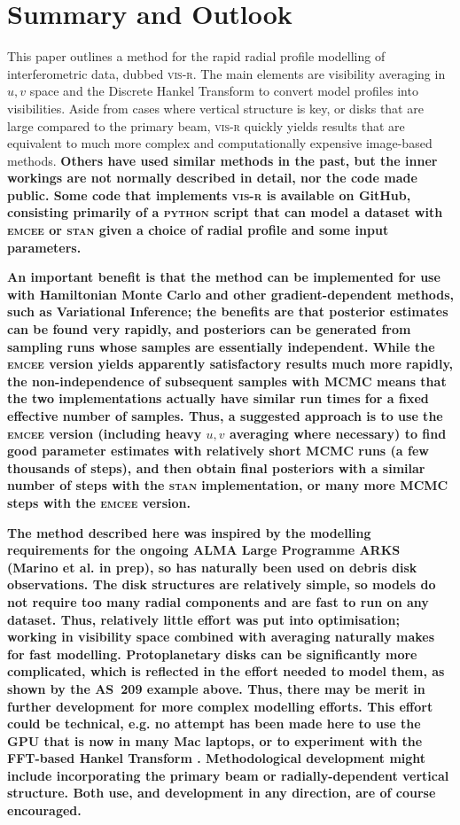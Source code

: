 \documentclass[fleqn,usenatbib]{mnras}
\begin{document}
\section{Summary and Outlook}

This paper outlines a method for the rapid radial profile modelling of interferometric data, dubbed \textsc{vis-r}. The main elements are visibility averaging in $u,v$ space and the Discrete Hankel Transform to convert model profiles into visibilities. Aside from cases where vertical structure is key, or disks that are large compared to the primary beam, \textsc{vis-r} quickly yields results that are equivalent to much more complex and computationally expensive image-based methods. \textbf{Others have used similar methods in the past, but the inner workings are not normally described in detail, nor the code made public. Some code that implements \textsc{vis-r} is available on GitHub, consisting primarily of a \textsc{python} script that can model a dataset with \textsc{emcee} or \textsc{stan} given a choice of radial profile and some input parameters.}

\textbf{An important benefit is that the method can be implemented for use with Hamiltonian Monte Carlo and other gradient-dependent methods, such as Variational Inference; the benefits are that posterior estimates can be found very rapidly, and posteriors can be generated from sampling runs whose samples are essentially independent. While the \textsc{emcee} version yields apparently satisfactory results much more rapidly, the non-independence of subsequent samples with MCMC means that the two implementations actually have similar run times for a fixed effective number of samples. Thus, a suggested approach is to use the \textsc{emcee} version (including heavy $u,v$ averaging where necessary) to find good parameter estimates with relatively short MCMC runs (a few thousands of steps), and then obtain final posteriors with a similar number of steps with the \textsc{stan} implementation, or many more MCMC steps with the \textsc{emcee} version.}

\textbf{The method described here was inspired by the modelling requirements for the ongoing ALMA Large Programme ARKS (Marino et al. in prep), so has naturally been used on debris disk observations. The disk structures are relatively simple, so models do not require too many radial components and are fast to run on any dataset. Thus, relatively little effort was put into optimisation; working in visibility space combined with averaging naturally makes for fast modelling. Protoplanetary disks can be significantly more complicated, which is reflected in the effort needed to model them, as shown by the AS~209 example above. Thus, there may be merit in further development for more complex modelling efforts. This effort could be technical, e.g. no attempt has been made here to use the GPU that is now in many Mac laptops, or to experiment with the FFT-based Hankel Transform \citep{2000MNRAS.312..257H}. Methodological development might include incorporating the primary beam or radially-dependent vertical structure. Both use, and development in any direction, are of course encouraged.}
\end{document}
